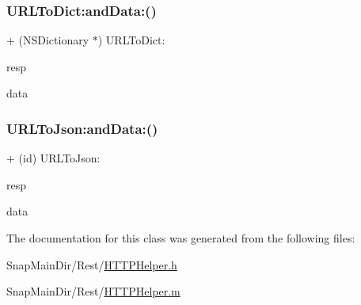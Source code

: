 \subsubsection{\texorpdfstring{U\+R\+L\+To\+Dict\+:and\+Data\+:()}{URLToDict:andData:()}}
{\footnotesize\ttfamily + (N\+S\+Dictionary $\ast$) U\+R\+L\+To\+Dict\+: \begin{DoxyParamCaption}\item[{(N\+S\+U\+R\+L\+Response $\ast$)}]{resp }\item[{andData:(N\+S\+Data $\ast$)}]{data }\end{DoxyParamCaption}}

\hypertarget{interface_h_t_t_p_helper_aa562571f57262ed6c99a33a31d98e0b9}{}\label{interface_h_t_t_p_helper_aa562571f57262ed6c99a33a31d98e0b9} 
\subsubsection{\texorpdfstring{U\+R\+L\+To\+Json\+:and\+Data\+:()}{URLToJson:andData:()}}
{\footnotesize\ttfamily + (id) U\+R\+L\+To\+Json\+: \begin{DoxyParamCaption}\item[{(N\+S\+U\+R\+L\+Response $\ast$)}]{resp }\item[{andData:(N\+S\+Data $\ast$)}]{data }\end{DoxyParamCaption}}



The documentation for this class was generated from the following files\+:\begin{DoxyCompactItemize}
\item 
Snap\+Main\+Dir/\+Rest/\hyperlink{_h_t_t_p_helper_8h}{H\+T\+T\+P\+Helper.\+h}\item 
Snap\+Main\+Dir/\+Rest/\hyperlink{_h_t_t_p_helper_8m}{H\+T\+T\+P\+Helper.\+m}\end{DoxyCompactItemize}
